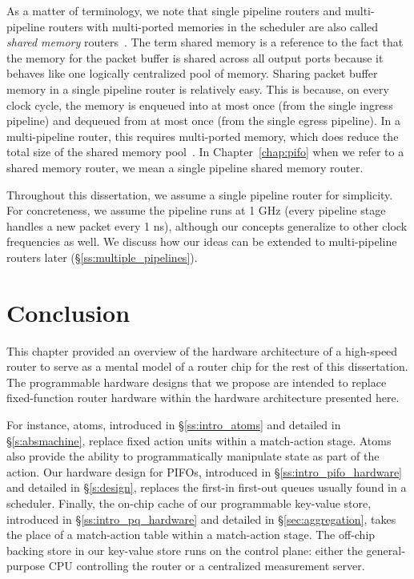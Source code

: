 As a matter of terminology, we note that single pipeline routers and
multi-pipeline routers with multi-ported memories in the scheduler are also
called {\em shared memory} routers~\cite{dctcp}. The term shared memory is a
reference to the fact that the memory for the packet buffer is shared across
all output ports because it behaves like one logically centralized pool of
memory. Sharing packet buffer memory in a single pipeline router is relatively
easy. This is because, on every clock cycle, the memory is enqueued into at
most once (from the single ingress pipeline) and dequeued from at most once
(from the single egress pipeline). In a multi-pipeline router, this requires
multi-ported memory, which does reduce the total size of the shared memory
pool~\cite{dctcp}. In Chapter~\ref{chap:pifo} when we refer to a shared memory
router, we mean a single pipeline shared memory router. 

Throughout this dissertation, we assume a single pipeline router for simplicity. For
concreteness, we assume the pipeline runs at 1 GHz (\ie every pipeline stage
handles a new packet every 1 ns), although our concepts generalize to other
clock frequencies as well. We discuss how our ideas can be extended to
multi-pipeline routers later (\S\ref{ss:multiple_pipelines}). 

\section{Conclusion}
This chapter provided an overview of the hardware architecture of a high-speed
router to serve as a mental model of a router chip for the rest of this
dissertation.  The programmable hardware designs that we propose are intended
to replace fixed-function router hardware within the hardware architecture
presented here.

For instance, atoms, introduced in \S\ref{ss:intro_atoms} and detailed in
\S\ref{s:absmachine}, replace fixed action units within a match-action stage.
Atoms also provide the ability to programmatically manipulate state as part of
the action.  Our hardware design for PIFOs, introduced in
\S\ref{ss:intro_pifo_hardware} and detailed in \S\ref{s:design}, replaces the
first-in first-out queues usually found in a scheduler. Finally, the on-chip
cache of our programmable key-value store, introduced in
\S\ref{ss:intro_pq_hardware} and detailed in \S\ref{sec:aggregation}, takes the
place of a match-action table within a match-action stage. The off-chip backing
store in our key-value store runs on the control plane: either the
general-purpose CPU controlling the router or a centralized measurement server.
